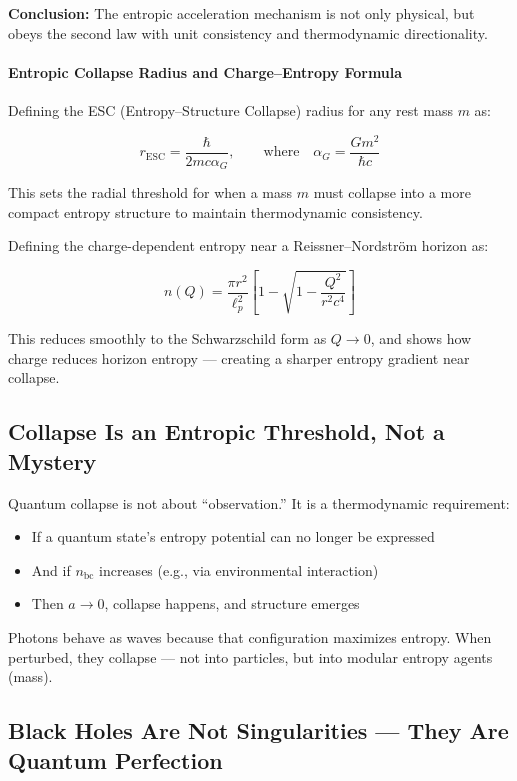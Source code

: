 \documentclass[12pt]{article}
\begin{document}
\noindent
\textbf{Conclusion:} The entropic acceleration mechanism is not only physical, but obeys the second law with unit consistency and thermodynamic directionality.

\paragraph{Entropic Collapse Radius and Charge–Entropy Formula}

\noindent
Defining the ESC (Entropy–Structure Collapse) radius for any rest mass $m$ as:

\[
\boxed{r_{\text{ESC}} = \frac{\hbar}{2 m c \alpha_G}}, \qquad \text{where} \quad \alpha_G = \frac{G m^2}{\hbar c}
\]

This sets the radial threshold for when a mass $m$ must collapse into a more compact entropy structure to maintain thermodynamic consistency.

\vspace{1em}
\noindent
Defining the charge-dependent entropy near a Reissner–Nordström horizon as:

\[
\boxed{n(Q) = \frac{\pi r^2}{\ell_p^2} \left[ 1 - \sqrt{1 - \frac{Q^2}{r^2 c^4}} \right]}
\]

This reduces smoothly to the Schwarzschild form as $Q \rightarrow 0$, and shows how charge reduces horizon entropy — creating a sharper entropy gradient near collapse.


\subsection{Collapse Is an Entropic Threshold, Not a Mystery}

Quantum collapse is not about ``observation.'' It is a thermodynamic requirement:
\begin{itemize}
    \item If a quantum state’s entropy potential can no longer be expressed
    \item And if $n_{\text{bc}}$ increases (e.g., via environmental interaction)
    \item Then $a \to 0$, collapse happens, and structure emerges
\end{itemize}

Photons behave as waves because that configuration maximizes entropy. When perturbed, they collapse — not into particles, but into modular entropy agents (mass).

\subsection{Black Holes Are Not Singularities — They Are Quantum Perfection}
\end{document}
